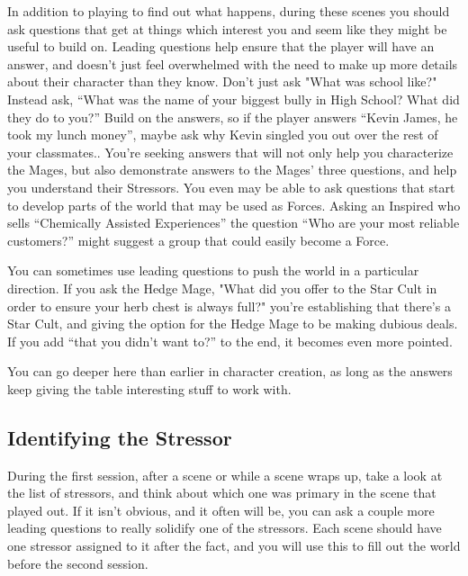 \documentclass[
  oneside,
  statementpaper,
  9pt]{memoir}
\begin{document}
\begin{MC}

In addition to playing to find out what happens, during these scenes you should ask questions that get at things which interest you and seem like they might be useful to build on. Leading questions help ensure that the player will have an answer, and doesn’t just feel overwhelmed with the need to make up more details about their character than they know. Don’t just ask "What was school like?" Instead ask, “What was the name of your biggest bully in High School? What did they do to you?” Build on the answers, so if the player answers “Kevin James, he took my lunch money”, maybe ask why Kevin singled you out over the rest of your classmates.. You’re seeking answers that will not only help you characterize the Mages, but also demonstrate answers to the Mages’ three questions, and help you understand their Stressors. You even may be able to ask questions that start to develop parts of the world that may be used as Forces. Asking an Inspired who sells “Chemically Assisted Experiences” the question “Who are your most reliable customers?” might suggest a group that could easily become a Force.

You can sometimes use leading questions to push the world in a particular direction. If you ask the Hedge Mage, "What did you offer to the Star Cult in order to ensure your herb chest is always full?" you’re establishing that there’s a Star Cult, and giving the option for the Hedge Mage to be making dubious deals. If you add “that you didn’t want to?” to the end, it becomes even more pointed.

You can go deeper here than earlier in character creation, as long as the answers keep giving the table interesting stuff to work with.

\end{MC}

\hypertarget{identifying-the-stressor}{%
\subsection{Identifying the Stressor}\label{identifying-the-stressor}}

\begin{MC}

During the first session, after a scene or while a scene wraps up, take a look at the list of stressors, and think about which one was primary in the scene that played out. If it isn’t obvious, and it often will be, you can ask a couple more leading questions to really solidify one of the stressors. Each scene should have one stressor assigned to it after the fact, and you will use this to fill out the world before the second session.

\end{MC}
\end{document}

